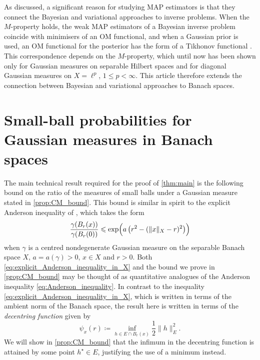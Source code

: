\documentclass[11pt]{article}
\newcommand*{\cball}[2]{B_{#2}(#1)}
\newcommand*{\defeq}{\coloneqq}
\renewcommand*{\leq}{\leqslant}
\theoremstyle{plain}
\theoremstyle{definition}
\newcommand{\norm}[1]{\lVert #1 \rVert}
\numberwithin{equation}{section}
\numberwithin{figure}{section}
\numberwithin{table}{section}
\begin{document}
As discussed, a significant reason for studying MAP estimators is that they connect the Bayesian and variational approaches to inverse problems.
When the $M$-property holds, the weak MAP estimators of a Bayesian inverse problem coincide with minimisers of an OM functional, and when a Gaussian prior is used, an OM functional for the posterior has the form of a Tikhonov functional \citep[see e.g.][]{DashtiLawStuartVoss2013}. 
This correspondence depends on the $M$-property, which until now has been shown only for Gaussian measures on separable Hilbert spaces and for diagonal Gaussian measures on $X = \ell^{p}$, $1 \leq p < \infty$.
This article therefore extends the connection between Bayesian and variational approaches to Banach spaces.

\section{Small-ball probabilities for Gaussian measures in Banach spaces}
\label{sec:small-ball_Gaussian_Banach}

The main technical result required for the proof of \cref{thm:main} is the following bound on the ratio of the measures of small balls under a Gaussian measure stated in \cref{prop:CM_bound}.
This bound is similar in spirit to the explicit Anderson inequality of \citet[Lemma~3.6]{DashtiLawStuartVoss2013}, which takes the form
\begin{equation}
	\label{eq:explicit_Anderson_inequality_in_X}
	\frac{\gamma(\cball{x}{r})}{\gamma(\cball{0}{r})} \leq \exp\Bigl( a\left(r^{2} - (\norm{x}_{X} - r)^{2} \right) \Bigr)
\end{equation}
when $\gamma$ is a centred nondegenerate Gaussian measure on the separable Banach space $X$, $a = a(\gamma) > 0$, $x \in X$ and $r > 0$.
Both \eqref{eq:explicit_Anderson_inequality_in_X} and the bound we prove in \cref{prop:CM_bound} may be thought of as quantitative analogues of the Anderson inequality \eqref{eq:Anderson_inequality}.
In contrast to the inequality \eqref{eq:explicit_Anderson_inequality_in_X}, which is written in terms of the ambient norm of the Banach space, the result here is written in terms of the \emph{decentring function} \citep{GhosalVanDerVaart2017} given by
\begin{equation*}
	\psi_{x}(r) \defeq \inf_{h \in E \cap \cball{x}{r}} \frac{1}{2} \norm{h}_{E}^{2}.
\end{equation*}
We will show in \cref{prop:CM_bound} that the infimum in the decentring function is attained by some point $h^{\star} \in E$, justifying the use of a minimum instead.
\end{document}

